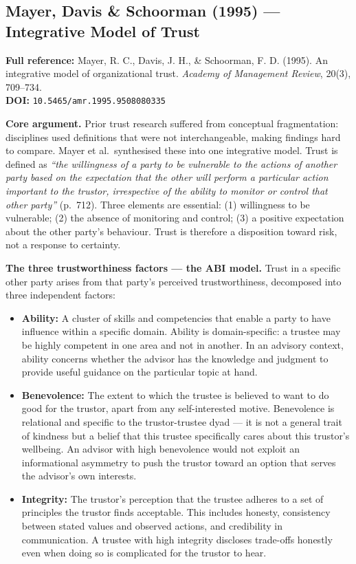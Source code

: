 \documentclass[11pt, a4paper]{article}
\begin{document}
\vspace{8pt}
\subsection{Mayer, Davis \& Schoorman (1995) --- Integrative Model of Trust}

\begin{refbox}
\textbf{Full reference:} Mayer, R. C., Davis, J. H., \& Schoorman, F. D. (1995). An integrative model of organizational trust. \textit{Academy of Management Review}, 20(3), 709--734.\\[4pt]
\textbf{DOI:} \texttt{10.5465/amr.1995.9508080335}
\end{refbox}

\textbf{Core argument.} Prior trust research suffered from conceptual fragmentation: disciplines used definitions that were not interchangeable, making findings hard to compare. Mayer et al.\ synthesised these into one integrative model. Trust is defined as \textit{``the willingness of a party to be vulnerable to the actions of another party based on the expectation that the other will perform a particular action important to the trustor, irrespective of the ability to monitor or control that other party''} (p.~712). Three elements are essential: (1) willingness to be vulnerable; (2) the absence of monitoring and control; (3) a positive expectation about the other party's behaviour. Trust is therefore a disposition toward risk, not a response to certainty.

\textbf{The three trustworthiness factors --- the ABI model.} Trust in a specific other party arises from that party's perceived trustworthiness, decomposed into three independent factors:

\begin{itemize}[leftmargin=2em]
  \item \textbf{Ability:} A cluster of skills and competencies that enable a party to have influence within a specific domain. Ability is domain-specific: a trustee may be highly competent in one area and not in another. In an advisory context, ability concerns whether the advisor has the knowledge and judgment to provide useful guidance on the particular topic at hand.
  \item \textbf{Benevolence:} The extent to which the trustee is believed to want to do good for the trustor, apart from any self-interested motive. Benevolence is relational and specific to the trustor-trustee dyad --- it is not a general trait of kindness but a belief that this trustee specifically cares about this trustor's wellbeing. An advisor with high benevolence would not exploit an informational asymmetry to push the trustor toward an option that serves the advisor's own interests.
  \item \textbf{Integrity:} The trustor's perception that the trustee adheres to a set of principles the trustor finds acceptable. This includes honesty, consistency between stated values and observed actions, and credibility in communication. A trustee with high integrity discloses trade-offs honestly even when doing so is complicated for the trustor to hear.
\end{itemize}
\end{document}
